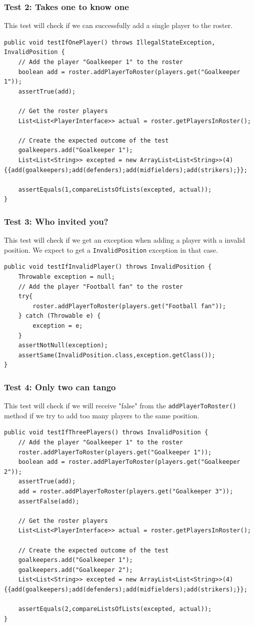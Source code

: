 \documentclass{article}
\begin{document}
\subsubsection*{Test 2: Takes one to know one}
This test will check if we can successfully add a single player to the roster.
\begin{lstlisting}
public void testIfOnePlayer() throws IllegalStateException, InvalidPosition {
	// Add the player "Goalkeeper 1" to the roster
	boolean add = roster.addPlayerToRoster(players.get("Goalkeeper 1"));
	assertTrue(add);
	
	// Get the roster players
	List<List<PlayerInterface>> actual = roster.getPlayersInRoster();
	
	// Create the expected outcome of the test
	goalkeepers.add("Goalkeeper 1");
	List<List<String>> excepted = new ArrayList<List<String>>(4) {{add(goalkeepers);add(defenders);add(midfielders);add(strikers);}};
	
	assertEquals(1,compareListsOfLists(excepted, actual));
}
\end{lstlisting}

\subsubsection*{Test 3: Who invited you?}
This test will check if we get an exception when adding a player with a invalid position. We expect to get a \texttt{InvalidPosition} exception in that case.
\begin{lstlisting}
public void testIfInvalidPlayer() throws InvalidPosition {
	Throwable exception = null;
	// Add the player "Football fan" to the roster
	try{
		roster.addPlayerToRoster(players.get("Football fan"));
	} catch (Throwable e) {
		exception = e;
	}
	assertNotNull(exception);
	assertSame(InvalidPosition.class,exception.getClass());
}
\end{lstlisting}

\subsubsection*{Test 4: Only two can tango}
This test will check if we will receive "false" from the \texttt{addPlayerToRoster()} method if we try to add too many players to the same position.
\begin{lstlisting}
public void testIfThreePlayers() throws InvalidPosition {
	// Add the player "Goalkeeper 1" to the roster
	roster.addPlayerToRoster(players.get("Goalkeeper 1"));
	boolean add = roster.addPlayerToRoster(players.get("Goalkeeper 2"));
	assertTrue(add);
	add = roster.addPlayerToRoster(players.get("Goalkeeper 3"));
	assertFalse(add);
	
	// Get the roster players
	List<List<PlayerInterface>> actual = roster.getPlayersInRoster();
	
	// Create the expected outcome of the test
	goalkeepers.add("Goalkeeper 1");
	goalkeepers.add("Goalkeeper 2");
	List<List<String>> excepted = new ArrayList<List<String>>(4) {{add(goalkeepers);add(defenders);add(midfielders);add(strikers);}};
	
	assertEquals(2,compareListsOfLists(excepted, actual));
}
\end{lstlisting}
\end{document}
